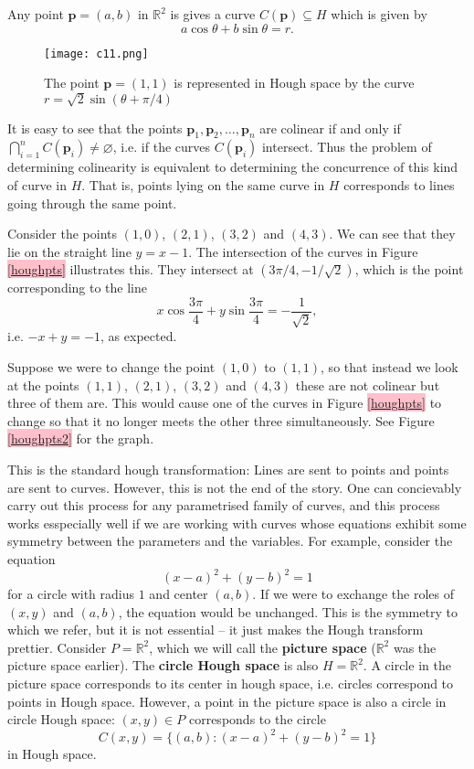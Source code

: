 \documentclass[a4paper,11pt,twoside]{article}
\theoremstyle{definition}
\theoremstyle{remark}
\newcommand{\sh}[1]{\colorbox{pink}{#1}}
\newcommand{\lnk}[1]{\sh{\hyperref[#1]{\ref*{#1}}}}
\begin{document}
Any point $\textbf{p}=(a,b)$ in $\mathbb{R}^2$ is gives a curve $C(\textbf{p})\subseteq H$ which is given by
\begin{displaymath}
a\cos\theta+b\sin\theta =r.
\end{displaymath}
\begin{figure}[!h]
  \caption{The point $\textbf{p}=(1,1)$ is represented in Hough space by the curve $r=\sqrt{2}\sin(\theta+\pi/4)$}
  \centering
    \texttt{[image: c11.png]}
    \label{c11}
\end{figure}
It is easy to see that the points $\textbf{p}_1,\textbf{p}_2,\dots, \textbf{p}_n$ are colinear if and only if $\bigcap^n_{i=1} C(\textbf{p}_i)\neq\varnothing$, i.e. if the curves $C(\textbf{p}_i)$ intersect. Thus the problem of determining colinearity is equivalent to determining the concurrence of this kind of curve in $H$. That is, points lying on the same curve in $H$ corresponds to lines going through the same point.

Consider the points $(1,0)$, $(2,1)$, $(3,2)$ and $(4,3)$. We can see that they lie on the straight line $y=x-1$. The intersection of the curves in Figure \lnk{houghpts} illustrates this. They intersect at $(3\pi/4,-1/\sqrt{2})$, which is the point corresponding to the line 
\begin{displaymath}
x\cos\frac{3\pi}{4}+y\sin\frac{3\pi}{4}=-\frac{1}{\sqrt{2}},
\end{displaymath}
i.e. $-x+y=-1$, as expected.

Suppose we were to change the point $(1,0)$ to $(1,1)$, so that instead we look at the points  $(1,1)$, $(2,1)$, $(3,2)$ and $(4,3)$ these are not colinear but three of them are. This would cause one of the curves in Figure \lnk{houghpts} to change so that it no longer meets the other three simultaneously. See Figure \lnk{houghpts2} for the graph.

This is the standard hough transformation: Lines are sent to points and points are sent to curves. However, this is not the end of the story. One can concievably carry out this process for any parametrised family of curves, and this process works esspecially well if we are working with curves whose equations exhibit some symmetry between the parameters and the variables. For example, consider the equation
\begin{displaymath}
(x-a)^2+(y-b)^2=1
\end{displaymath}
for a circle with radius $1$ and center $(a,b)$. If we were to exchange the roles of $(x,y)$ and $(a,b)$, the equation would be unchanged. This is the symmetry to which we refer, but it is not essential -- it just makes the Hough transform prettier. Consider $P=\mathbb{R}^2$, which we will call the \textbf{picture space} ($\mathbb{R}^2$ was the picture space earlier). The \textbf{circle Hough space} is also $H = \mathbb{R}^2$. A circle in the picture space corresponds to its center in hough space, i.e. circles correspond to points in Hough space. However, a point in the picture space is also a circle in circle Hough space: $(x,y)\in P$ corresponds to the circle
\begin{displaymath}
C(x,y) = \{(a,b):(x-a)^2+(y-b)^2=1\}
\end{displaymath} 
in Hough space. 
\end{document}
